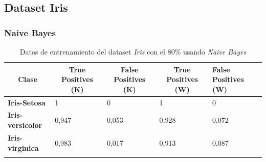 \documentclass[10pt,a4paper]{article}
\begin{document}
\subsection{Dataset Iris}
\subsubsection{Naive Bayes}
\begin{table}[h!]
	\begin{tabular}{lllll}
		\hline
		\multicolumn{1}{|c|}{\textbf{Clase}} & \multicolumn{1}{c|}{\textbf{True Positives (K)}} & \multicolumn{1}{c|}{\textbf{False Positives (K)}} & \multicolumn{1}{c|}{\textbf{True Positives (W)}} & \multicolumn{1}{l|}{\textbf{False Positives (W)}} \\ \hline
		\multicolumn{1}{|l|}{\textbf{Iris-Setosa}} & \multicolumn{1}{l|}{1}          & \multicolumn{1}{l|}{0}          & \multicolumn{1}{l|}{1}          & \multicolumn{1}{l|}{0} \\ \hline
		\multicolumn{1}{|l|}{\textbf{Iris-versicolor}} & \multicolumn{1}{l|}{0,947}          & \multicolumn{1}{l|}{0,053}          & \multicolumn{1}{l|}{0,928}          & \multicolumn{1}{l|}{0,072} \\ \hline
		\multicolumn{1}{|l|}{\textbf{Iris-virginica}} & \multicolumn{1}{l|}{0,983}          & \multicolumn{1}{l|}{0,017}          & \multicolumn{1}{l|}{0,913}          & \multicolumn{1}{l|}{0,087}\\ \hline
		\textbf{}                       &                                &                                &                                &                      
 
	\end{tabular}
	\caption{Datos de entrenamiento del dataset \emph{Iris} con el 80\% usando \emph{Naive Bayes}}
	\label{tab:iris_bayes_80}
\end{table}
\end{document}
